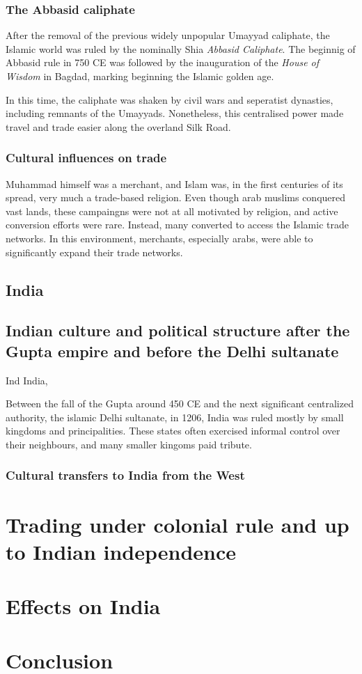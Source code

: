 \documentclass[11pt, a4paper, headings=standardclasses]{scrartcl}
\begin{document}
\subsubsection{The Abbasid caliphate}

After the removal of the previous widely unpopular\autocite{Umayyad} Umayyad caliphate, the Islamic world was ruled by the nominally Shia \emph{Abbasid Caliphate}. The beginnig of Abbasid rule in 750 CE was followed by the inauguration of the \emph{House of Wisdom} in Bagdad, marking beginning the Islamic golden age.\autocite{Abbasid}

In this time, the caliphate was shaken by civil wars and seperatist dynasties, including remnants of the Umayyads.\autocite[Section \textit{End}]{Umayyad} Nonetheless, this centralised power made travel and trade easier along the overland Silk Road.

\subsubsection{Cultural influences on trade}

Muhammad himself was a merchant\autocite{Muhammad}, and Islam was, in the first centuries of its spread, very much a trade-based religion. Even though arab muslims conquered vast lands, these campaingns were not at all motivated by religion\autocite[200]{Lapidus}, and active conversion efforts were rare. Instead, many converted to access the Islamic trade networks.\autocite{SilkRoadIslam} In this environment, merchants, especially arabs, were able to significantly expand their trade networks.

\subsection{India}

\subsection{Indian culture and political structure after the Gupta empire and before the Delhi sultanate}
Ind India, 

Between the fall of the Gupta around 450 CE\autocite[Section: The Gupta]{India} and the next significant centralized authority, the islamic Delhi sultanate, in 1206\autocite{Delhi}, India was ruled mostly by small kingdoms and principalities. These states often exercised informal control over their neighbours, and many smaller kingoms paid tribute.

\subsubsection{Cultural transfers to India from the West}
\section{Trading under colonial rule and up to Indian independence}
\section{Effects on India}
\section{Conclusion}
\clearpage
\appendix
\printbibliography
\end{document}

